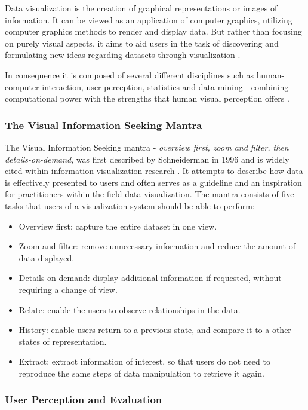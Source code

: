 \documentclass{article}
\begin{document}
Data visualization is the creation of graphical representations or images of information. It can be viewed as an application of computer graphics, utilizing computer graphics methods to render and display data. But rather than focusing on purely visual aspects, it aims to aid users in the task of discovering and formulating new ideas regarding datasets through visualization \cite{Chad}. 

In consequence it is composed of several different disciplines such as human-computer interaction, user perception, statistics and data mining - combining computational power with the strengths that human visual perception offers \cite{Chad}. 



\subsubsection{The Visual Information Seeking Mantra} 
The Visual Information Seeking mantra - \emph{overview first, zoom and filter, then details-on-demand}, was first described by Schneiderman in 1996 and is widely cited within information visualization research \cite{Craft}. It attempts to describe how data is effectively presented to users and often serves as a guideline and an inspiration for practitioners within the field data visualization. The mantra consists of five tasks that users of a visualization system should be able to perform: 


\begin{itemize}
    \item Overview first: capture the entire dataset in one view.
    \item Zoom and filter: remove unnecessary information and reduce the amount of data displayed.
    \item Details on demand: display additional information if requested, without requiring a change of view.
    \item Relate: enable the users to observe relationships in the data. 
    \item History: enable users return to a previous state, and compare it to a other states of representation.  
    \item Extract: extract information of interest, so that users do not need to reproduce the same steps of data manipulation to retrieve it again. 
\end{itemize}


\subsubsection{User Perception and Evaluation}
\end{document}
